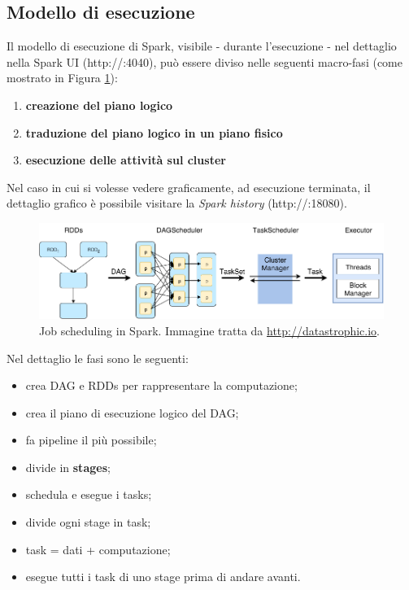 \documentclass[12pt,italian]{article}
\begin{document}
\subsection{Modello di esecuzione} 
Il modello di esecuzione di Spark, visibile - durante l'esecuzione - nel dettaglio nella Spark UI (http://:4040), può essere diviso nelle seguenti macro-fasi (come mostrato in Figura \ref{fig:model}):
\begin{enumerate}
	\item \textbf{creazione del piano logico}
	\item \textbf{traduzione del piano logico in un piano fisico}
	\item \textbf{esecuzione delle attività sul cluster}
\end{enumerate}
Nel caso in cui si volesse vedere graficamente, ad esecuzione terminata, il dettaglio grafico è possibile visitare la \textit{Spark history} (http://:18080).
\begin{figure}[H]
	\centering 
	\includegraphics[width=1\linewidth]{img/model.png}
	\caption{Job scheduling in Spark. Immagine tratta da \url{http://datastrophic.io}.}
	\label{fig:model}
\end{figure}
Nel dettaglio le fasi sono le seguenti:
\begin{itemize}
	\item crea DAG e RDDs per rappresentare la computazione;
	\item crea il piano di esecuzione logico del DAG;
	\item fa pipeline il più possibile;
	\item divide in \textbf{stages};
	\item schedula e esegue i tasks;
	\item divide ogni stage in task;
	\item task = dati + computazione;
	\item esegue tutti i task di uno stage prima di andare avanti.
\end{itemize}
\end{document}
